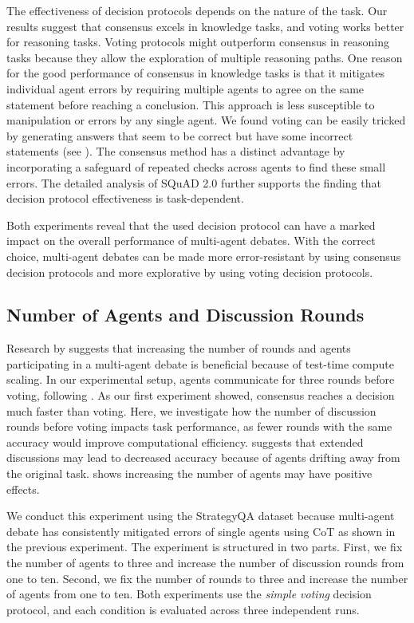 The effectiveness of decision protocols depends on the nature of the task. 
Our results suggest that consensus excels in knowledge tasks, and voting works better for reasoning tasks.
Voting protocols might outperform consensus in reasoning tasks because they allow the exploration of multiple reasoning paths. %
One reason for the good performance of consensus in knowledge tasks is that it mitigates individual agent errors by requiring multiple agents to agree on the same statement before reaching a conclusion. 
This approach is less susceptible to manipulation or errors by any single agent. 
We found voting can be easily tricked by generating answers that seem to be correct but have some incorrect statements (see ).
The consensus method has a distinct advantage by incorporating a safeguard of repeated checks across agents to find these small errors.
The detailed analysis of SQuAD 2.0 further supports the finding that decision protocol effectiveness is task-dependent. 


Both experiments reveal that the used decision protocol can have a marked impact on the overall performance of multi-agent debates.
With the correct choice, multi-agent debates can be made more error-resistant by using consensus decision protocols and more explorative by using voting decision protocols.



\subsection{Number of Agents and Discussion Rounds}
\label{sec:experiment-numagents}
Research by \citet{yin_exchange--thought_2023} suggests that increasing the number of rounds and agents participating in a multi-agent debate is beneficial because of test-time compute scaling.
In our experimental setup, agents communicate for three rounds before voting, following \citet{du_improving_2023}. 
As our first experiment showed, consensus reaches a decision much faster than voting.
Here, we investigate how the number of discussion rounds before voting impacts task performance, as fewer rounds with the same accuracy would improve computational efficiency.
\citet{becker_multi-agent_2024} suggests that extended discussions may lead to decreased accuracy because of agents drifting away from the original task. 
\citet{wang_rethinking_2024} shows increasing the number of agents may have positive effects. 

We conduct this experiment using the StrategyQA dataset because multi-agent debate has consistently mitigated errors of single agents using \ac{CoT} as shown in the previous experiment.
The experiment is structured in two parts.
First, we fix the number of agents to three and increase the number of discussion rounds from one to ten. 
Second, we fix the number of rounds to three and increase the number of agents from one to ten. 
Both experiments use the \textit{simple voting} decision protocol, and each condition is evaluated across three independent runs. 


